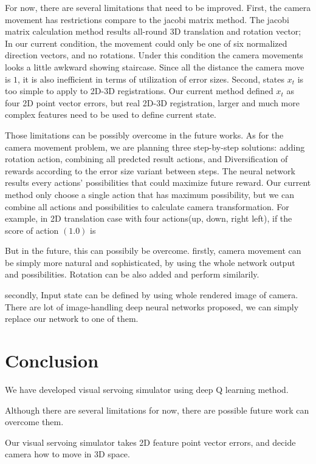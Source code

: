 \documentclass[10pt]{article}
\begin{document}
 For now, there are several limitations that need to be improved. First, the camera movement has restrictions compare to the jacobi matrix method. The jacobi matrix calculation method results all-round 3D translation and rotation vector; In our current condition, the movement could only be one of six normalized direction vectors, and no rotations. Under this condition the camera movements looks a little awkward showing staircase. Since all the distance the camera move is $1$, it is also inefficient in terms of utilization of error sizes. Second, states $x_t$ is too simple to apply to 2D-3D registrations. Our current method defined $x_t$ as four 2D point vector errors, but real 2D-3D registration, larger and much more complex features need to be used to define current state.

 Those limitations can be possibly overcome in the future works. As for the camera movement problem, we are planning three step-by-step solutions: adding rotation action, combining all predcted result actions, and Diversification of rewards according to the error size variant between steps. The neural network results every actions' possibilities that could maximize future reward. Our current method only choose a single action that has maximum possibility, but we can combine all actions and possibilities to calculate camera transformation. For example, in 2D translation case with four actions(up, down, right left), if the score of action $(1.0)$ is 


But in the future, this can possibily be overcome.
firstly, camera movement can be simply more natural and sophisticated, by using the whole network output and possibilities.
Rotation can be also added and perform similarily.

secondly, Input state can be defined by using whole rendered image of camera. There are lot of image-handling deep neural networks proposed, we can simply replace our network to one of them.



\section{Conclusion}

We have developed visual servoing simulator using deep Q learning method.

Although there are several limitations for now, there are possible future work can overcome them.

Our visual servoing simulator takes 2D feature point vector errors, and decide camera how to move in 3D space.
\end{document}
